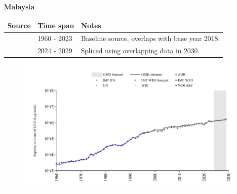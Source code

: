\documentclass[12pt,a4paper,landscape]{article}
\begin{document}
\begin{adjustbox}{max totalsize={\paperwidth}{\paperheight},center}
\begin{minipage}[t][\textheight][t]{\textwidth}
\vspace*{0.5cm}
{}
\begin{center}
{\Large\bfseries Malaysia}
\end{center}
\vspace{0.5cm}
\begin{table}[H]
\centering
\small
\begin{tabular}{|l|l|l|}
\hline
\textbf{Source} & \textbf{Time span} & \textbf{Notes} \\
\hline
\rowcolor{white}\cite{WDI}& 1960 - 2023 &Baseline source, overlaps with base year 2018.\\
\rowcolor{lightgray}\cite{IMF_WEO_forecast}& 2024 - 2029 &Spliced using overlapping data in 2030.\\
\hline
\end{tabular}
\end{table}
\begin{figure}[H]
\centering
\includegraphics[width=\textwidth,height=0.6\textheight,keepaspectratio]{graphs/MYS_imports.pdf}
\end{figure}
\end{minipage}
\end{adjustbox}
\end{document}
